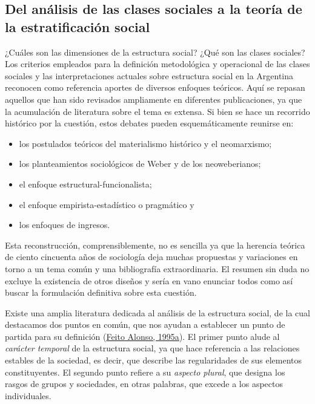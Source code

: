 \documentclass[
]{article}
\providecommand{\tightlist}{%
  \setlength{\itemsep}{0pt}\setlength{\parskip}{0pt}}
\begin{document}
\hypertarget{analisis1}{%
\subsection{Del análisis de las clases sociales a la teoría de la estratificación social}\label{analisis1}}

¿Cuáles son las dimensiones de la estructura social? ¿Qué son las clases sociales? Los criterios empleados para la definición metodológica y operacional de las clases sociales y las interpretaciones actuales sobre estructura social en la Argentina reconocen como referencia aportes de diversos enfoques teóricos. Aquí se repasan aquellos que han sido revisados ampliamente en diferentes publicaciones, ya que la acumulación de literatura sobre el tema es extensa. Si bien se hace un recorrido histórico por la cuestión, estos debates pueden esquemáticamente reunirse en:

\begin{itemize}
\tightlist
\item
  los postulados teóricos del materialismo histórico y el neomarxismo;
\item
  los planteamientos sociológicos de Weber y de los neoweberianos;
\item
  el enfoque estructural-funcionalista;
\item
  el enfoque empirista-estadístico o pragmático y
\item
  los enfoques de ingresos.
\end{itemize}

Esta reconstrucción, comprensiblemente, no es sencilla ya que la herencia teórica de ciento cincuenta años de sociología deja muchas propuestas y variaciones en torno a un tema común y una bibliografía extraordinaria. El resumen sin duda no excluye la existencia de otros diseños y sería en vano enunciar todos como así buscar la formulación definitiva sobre esta cuestión.

Existe una amplia literatura dedicada al análisis de la estructura social, de la cual destacamos dos puntos en común, que nos ayudan a establecer un punto de partida para su definición (\protect\hyperlink{ref-FeitoAlonso1995}{Feito Alonso, 1995a}). El primer punto alude al \emph{carácter temporal} de la estructura social, ya que hace referencia a las relaciones estables de la sociedad, es decir, que describe las regularidades de sus elementos constituyentes. El segundo punto refiere a su \emph{aspecto plural}, que designa los rasgos de grupos y sociedades, en otras palabras, que excede a los aspectos individuales.
\end{document}
